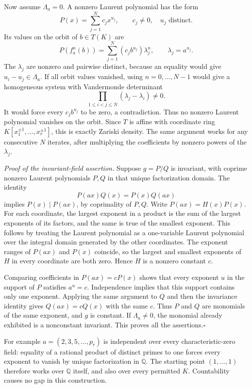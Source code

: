 \documentclass[11pt]{article}
\begin{document}
Now assume $\Lambda_a=0$. A nonzero Laurent polynomial has the form
\[
 P(x)=\sum_{j=1}^N c_jx^{u_j},
 \qquad c_j\ne0,\quad u_j\text{ distinct}.
\]
Its values on the orbit of $b\in T(K)$ are
\[
 P(f_a^n(b))=\sum_{j=1}^N(c_jb^{u_j})\lambda_j^n,
 \qquad \lambda_j=a^{u_j}.
\]
The $\lambda_j$ are nonzero and pairwise distinct, because an equality
would give $u_i-u_j\in\Lambda_a$. If all orbit values vanished, using
$n=0,\ldots,N-1$ would give a homogeneous system with Vandermonde
determinant
\[
 \prod_{1\le i<j\le N}(\lambda_j-\lambda_i)\ne0.
\]
It would force every $c_jb^{u_j}$ to be zero, a contradiction. Thus no
nonzero Laurent polynomial vanishes on the orbit. Since $T$ is affine
with coordinate ring $K[x_1^{\pm1},\ldots,x_r^{\pm1}]$, this is exactly
Zariski density. The same argument works for any consecutive $N$ iterates,
after multiplying the coefficients by nonzero powers of the $\lambda_j$.

\emph{Proof of the invariant-field assertion.}
Suppose $g=P/Q$ is invariant, with coprime nonzero Laurent polynomials
$P,Q$ in that unique factorization domain. The identity
\[
 P(ax)Q(x)=P(x)Q(ax)
\]
implies $P(x)\mid P(ax)$, by coprimality of $P,Q$. Write
$P(ax)=H(x)P(x)$. For each coordinate, the largest exponent in a product
is the sum of the largest exponents of its factors, and the same is true
of the smallest exponent. This follows by treating the Laurent polynomial
as a one-variable Laurent polynomial over the integral domain generated
by the other coordinates. The exponent ranges of $P(ax)$ and $P(x)$
coincide, so the largest and smallest exponents of $H$ in every coordinate
are both zero. Hence $H$ is a nonzero constant $c$.

Comparing coefficients in $P(ax)=cP(x)$ shows that every exponent $u$ in
the support of $P$ satisfies $a^u=c$. Independence implies that this
support contains only one exponent. Applying the same argument to $Q$
and then the invariance identity gives $Q(ax)=cQ(x)$ with the same $c$.
Thus $P$ and $Q$ are monomials of the same exponent, and $g$ is constant.
If $\Lambda_a\ne0$, the monomial already exhibited is a nonconstant
invariant. This proves all the assertions.\hfill$\square$

For example $a=(2,3,5,\ldots,p_r)$ is independent over every
characteristic-zero field: equality of a rational product of distinct
primes to one forces every exponent to vanish by unique factorization in
$\mathbb Q$. The starting point $(1,\ldots,1)$ therefore works over
$\mathbb Q$ itself, and also over every permitted $K$. Countability causes
no gap in this construction.
\end{document}
